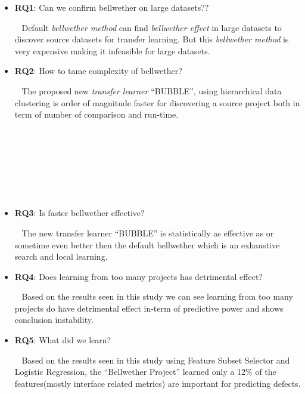 \documentclass[10pt,journal,compsoc]{IEEEtran}
\newenvironment{RQ}[1]%
{\noindent\begin{minipage}[c]{\linewidth}%
\begin{bclogo}[couleur=gray!20,%
                arrondi=0.1,logo=\bctrombone,%
                ombre=true]{{\small ~#1}}}%
{\end{bclogo}\vspace{2mm}\end{minipage}}
\begin{document}
\begin{itemize}
        \item 
            \textbf{RQ1}:  Can we confirm bellwether on large datasets??
            
            \begin{RQ}{
                Default \textit{bellwether method} can find \textit{bellwether effect} in large datasets to discover source datasets for transfer learning. But this \textit{bellwether method} is very expensive making it infeasible for large datasets.}
            \end{RQ}

        \item 
            \textbf{RQ2}: How to tame complexity of bellwether?
            
             \begin{RQ}{
                The proposed new \textit{transfer learner} ``BUBBLE'', using hierarchical data clustering is order of magnitude faster for discovering a source project both in term of number of comparison and run-time.}
            \end{RQ}
        \\   
        \\
        \\
        \\
        \\
        \\
        \item 
            \textbf{RQ3}:  Is faster bellwether effective?
            
            \begin{RQ}{
                The new transfer learner ``BUBBLE'' is statistically as effective as or sometime even better then the default bellwether which is an exhaustive search and local learning. }
            \end{RQ}
        
        \item 
            \textbf{RQ4}: Does learning from too many projects has detrimental effect?
            
            \begin{RQ}{
                Based on the results seen in this study we can see learning from too many projects do have detrimental effect in-term of predictive power and shows conclusion instability.}
            \end{RQ}
            
        \item 
            \textbf{RQ5}: What did we learn?
            
            \begin{RQ}{
                Based on the results seen in this study using Feature Subset Selector and Logistic Regression, the ``Bellwether Project'' learned only a 12\% of the features(mostly interface related metrics) are important for predicting defects.}
            \end{RQ}

    \end{itemize}
\end{document}
